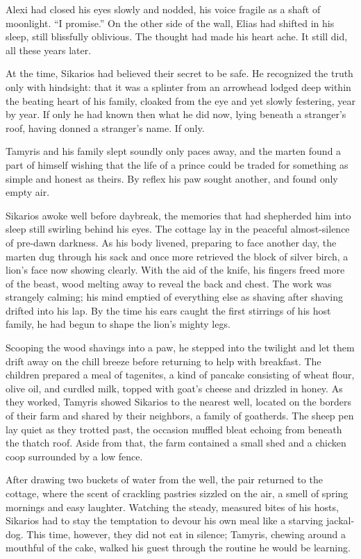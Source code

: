Alexi had closed his eyes slowly and nodded, his voice fragile as a shaft of moonlight. ``I promise.'' On the other side of the wall, Elias had shifted in his sleep, still blissfully oblivious. The thought had made his heart ache. It still did, all these years later.

At the time, Sikarios had believed their secret to be safe. He recognized the truth only with hindsight: that it was a splinter from an arrowhead lodged deep within the beating heart of his family, cloaked from the eye and yet slowly festering, year by year. If only he had known then what he did now, lying beneath a stranger's roof, having donned a stranger's name. If only.

Tamyris and his family slept soundly only paces away, and the marten found a part of himself wishing that the life of a prince could be traded for something as simple and honest as theirs. By reflex his paw sought another, and found only empty air.

\secdiv

Sikarios awoke well before daybreak, the memories that had shepherded him into sleep still swirling behind his eyes. The cottage lay in the peaceful almost-silence of pre-dawn darkness. As his body livened, preparing to face another day, the marten dug through his sack and once more retrieved the block of silver birch, a lion's face now showing clearly. With the aid of the knife, his fingers freed more of the beast, wood melting away to reveal the back and chest. The work was strangely calming; his mind emptied of everything else as shaving after shaving drifted into his lap. By the time his ears caught the first stirrings of his host family, he had begun to shape the lion's mighty legs.

Scooping the wood shavings into a paw, he stepped into the twilight and let them drift away on the chill breeze before returning to help with breakfast. The children prepared a meal of tagenites, a kind of pancake consisting of wheat flour, olive oil, and curdled milk, topped with goat's cheese and drizzled in honey. As they worked, Tamyris showed Sikarios to the nearest well, located on the borders of their farm and shared by their neighbors, a family of goatherds. The sheep pen lay quiet as they trotted past, the occasion muffled bleat echoing from beneath the thatch roof. Aside from that, the farm contained a small shed and a chicken coop surrounded by a low fence.

After drawing two buckets of water from the well, the pair returned to the cottage, where the scent of crackling pastries sizzled on the air, a smell of spring mornings and easy laughter. Watching the steady, measured bites of his hosts, Sikarios had to stay the temptation to devour his own meal like a starving jackal-dog. This time, however, they did not eat in silence; Tamyris, chewing around a mouthful of the cake, walked his guest through the routine he would be learning.

